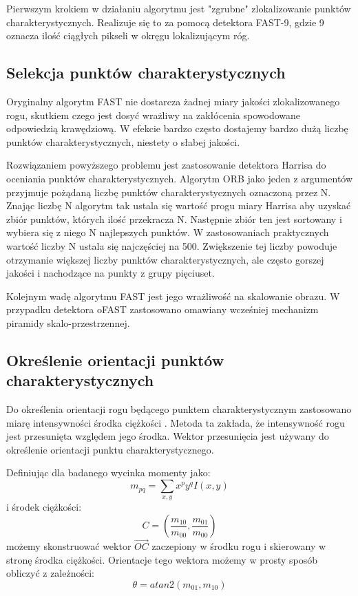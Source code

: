 Pierwszym krokiem w działaniu algorytmu jest "zgrubne" zlokalizowanie punktów charakterystycznych. Realizuje się to za pomocą detektora FAST-9, gdzie 9 oznacza ilość ciągłych pikseli w okręgu lokalizującym róg.

\subsection{Selekcja punktów charakterystycznych}
Oryginalny algorytm FAST nie dostarcza żadnej miary jakości zlokalizowanego rogu,  skutkiem czego jest dosyć wrażliwy na zakłócenia spowodowane odpowiedzią krawędziową. W efekcie bardzo często dostajemy bardzo dużą liczbę punktów charakterystycznych, niestety o słabej jakości. 

Rozwiązaniem powyższego problemu jest zastosowanie detektora Harrisa do oceniania punktów charakterystycznych. Algorytm ORB jako jeden z argumentów przyjmuje pożądaną liczbę punktów charakterystycznych oznaczoną przez N. Znając liczbę N algorytm tak ustala się wartość progu miary Harrisa aby uzyskać zbiór punktów, których ilość przekracza N. Następnie zbiór ten jest sortowany i wybiera się z niego N najlepszych punktów. W zastosowaniach praktycznych wartość liczby N ustala się najczęściej na 500. Zwiększenie tej liczby powoduje otrzymanie większej liczby punktów charakterystycznych, ale często gorszej jakości i nachodzące na punkty z grupy pięciuset.

Kolejnym wadę algorytmu FAST jest jego wrażliwość na skalowanie obrazu. W przypadku detektora oFAST zastosowano omawiany wcześniej mechanizm piramidy skalo-przestrzennej.
\subsection{Określenie orientacji punktów charakterystycznych}
Do określenia orientacji rogu będącego punktem charakterystycznym zastosowano miarę intensywności środka ciężkości \cite{centroid}. Metoda ta zakłada, że intensywność rogu jest przesunięta względem jego środka. Wektor przesunięcia jest używany do określenie orientacji punktu charakterystycznego. 

Definiując dla badanego wycinka momenty jako:
\begin{equation}
m_{pq} = \sum\limits_{x,y} x^p y^q I(x,y)
\end{equation}
i środek ciężkości:
\begin{equation}
C = \left(\frac{m_{10}}{m_{00}},\frac{m_{01}}{m_{00}}\right)
\end{equation}
możemy skonstruować wektor $\overrightarrow{OC}$ zaczepiony w środku rogu i skierowany w stronę środka ciężkości. Orientacje tego wektora możemy w prosty sposób obliczyć z zależności:
\begin{equation}
\theta = atan2(m_{01},m_{10})
\end{equation}

